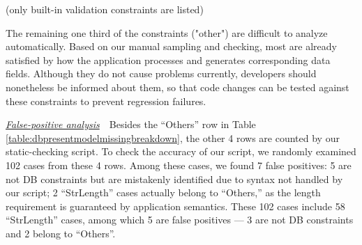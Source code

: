 \begin{table}
\centering
\setlength{\tabcolsep}{1.5pt}  
\caption{\# Constraints in Application but not in DB }
{\textmd{(only
built-in validation constraints are listed)}}
 
\label{table:modelpresentdbmissingbreakdown}
\end{table}

The remaining one third of the constraints ("other") are difficult to analyze automatically. Based on our manual sampling and checking, most  
are already satisfied by how the application processes and generates corresponding data fields. 
Although they do not cause problems currently, developers should nonetheless be informed about them, so that code changes can be tested
against these constraints to prevent regression failures. 

\underline{\it False-positive analysis}\ \ Besides the ``Others'' row in Table \ref{table:dbpresentmodelmissingbreakdown},  
the other 4 rows are counted by our static-checking script. 
To check the accuracy of our script,
we randomly examined 102 cases from these 4 rows.
Among these cases, we found 7 false positives: 5 are not
DB constraints but are mistakenly identified due to syntax not handled by our script; 2 ``StrLength'' cases  
actually belong to ``Others,'' as the length requirement is guaranteed
by application semantics. These 102 cases include 58 ``StrLength''
cases, among which 5 are false positives --- 3 are not
DB constraints and 2 belong to ``Others''. %

